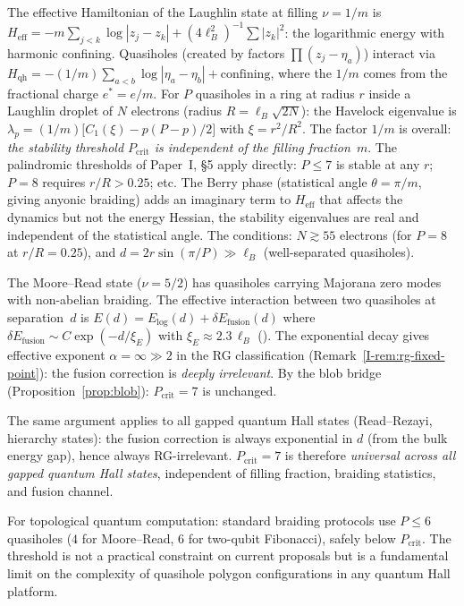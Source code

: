 \begin{remark}
\label{rmk:laughlin}
The effective Hamiltonian of the Laughlin state at filling
$\nu = 1/m$ is $H_{\mathrm{eff}} = -m\sum_{j<k}\log|z_j{-}z_k|
+ (4\ell_B^2)^{-1}\sum|z_k|^2$: the logarithmic energy with
harmonic confining.
Quasiholes (created by factors $\prod(z_j{-}\eta_a)$) interact
via $H_{\mathrm{qh}} = -(1/m)\sum_{a<b}\log|\eta_a{-}\eta_b|
+ \text{confining}$, where the $1/m$ comes from the fractional
charge $e^* = e/m$.
For $P$ quasiholes in a ring at radius $r$ inside a Laughlin
droplet of $N$ electrons (radius $R = \ell_B\sqrt{2N}$):
the Havelock eigenvalue is
$\lambda_p = (1/m)\bigl[C_1(\xi) - p(P{-}p)/2\bigr]$
with $\xi = r^2/R^2$.
The factor $1/m$ is overall: \emph{the stability threshold
$P_{\mathrm{crit}}$ is independent of the filling fraction~$m$}.
The palindromic thresholds of Paper~I, \S5 apply directly:
$P \le 7$ is stable at any $r$; $P = 8$ requires
$r/R > 0.25$; etc.
The Berry phase (statistical angle $\theta = \pi/m$, giving
anyonic braiding) adds an imaginary term to $H_{\mathrm{eff}}$
that affects the dynamics but not the energy Hessian, the
stability eigenvalues are real and independent of the
statistical angle.
The conditions:
$N \gtrsim 55$ electrons (for $P = 8$ at $r/R = 0.25$),
and $d = 2r\sin(\pi/P) \gg \ell_B$ (well-separated
quasiholes).
\end{remark}

\begin{remark}
\label{rmk:non-abelian}
The Moore--Read state ($\nu = 5/2$) has quasiholes carrying
Majorana zero modes with non-abelian braiding.
The effective interaction between two quasiholes at
separation~$d$ is
$E(d) = E_{\log}(d) + \delta E_{\mathrm{fusion}}(d)$
where $\delta E_{\mathrm{fusion}} \sim C\exp(-d/\xi_E)$
with $\xi_E \approx 2.3\,\ell_B$
(\citealt{Baraban2009}).
The exponential decay gives effective exponent
$\alpha = \infty \gg 2$ in the RG classification
(Remark~\ref*{I-rem:rg-fixed-point}):
the fusion correction is \emph{deeply irrelevant}.
By the blob bridge (Proposition~\ref{prop:blob}):
$P_{\mathrm{crit}} = 7$ is unchanged.

The same argument applies to all gapped quantum Hall states
(Read--Rezayi, hierarchy states): the fusion correction is
always exponential in $d$ (from the bulk energy gap), hence
always RG-irrelevant.
$P_{\mathrm{crit}} = 7$ is therefore \emph{universal across
all gapped quantum Hall states}, independent of filling
fraction, braiding statistics, and fusion channel.

For topological quantum computation: standard braiding
protocols use $P \le 6$ quasiholes ($4$ for Moore--Read,
$6$ for two-qubit Fibonacci), safely below $P_{\mathrm{crit}}$.
The threshold is not a practical constraint on current
proposals but is a fundamental limit on the complexity of
quasihole polygon configurations in any quantum Hall platform.
\end{remark}


